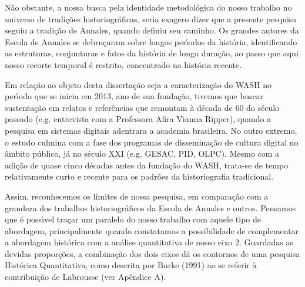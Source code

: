 \documentclass[
12pt,		%
openright,	%
twoside,  %
a4paper,			%
chapter=TITLE,		%
english,			%
french,				%
spanish,			%
brazil				%
]{USPSC-classe/USPSC}
\begin{document}
N\~ao obstante, a nossa busca pela identidade metodol\'ogica do nosso trabalho no universo de tradi\c{c}\~oes historiogr\'aficas, seria exagero dizer que a presente pesquisa seguiu a tradi\c{c}\~ao de Annales, quando definiu seu caminho. Os grandes autores da Escola de Annales se debru\c{c}aram sobre longos per\'{\i}odos da hist\'oria, identificando as estruturas, conjunturas e fatos da \textquotedbl hist\'oria de longa dura\c{c}\~ao\textquotedbl , ao passo que aqui nosso recorte temporal \'e restrito, concentrado na hist\'oria recente.

















Em rela\c{c}\~ao ao objeto desta disserta\c{c}\~ao seja a caracteriza\c{c}\~ao do WASH no per\'{\i}odo que se inicia em 2013, ano de sua funda\c{c}\~ao, tivemos que buscar sustenta\c{c}\~ao em relatos e refer\^encias que remontam \`a d\'ecada de 60 do s\'eculo passado (e.g. entrevista com a Professora Afira Vianna Ripper), quando a pesquisa em sistemas digitais adentrara a academia brasileira. No outro extremo, o estudo culmina com a fase dos programas de dissemina\c{c}\~ao de cultura digital no \^ambito p\'ublico, j\'a no s\'eculo XXI (e.g. GESAC, PID, OLPC).  Mesmo com a adi\c{c}\~ao de quase cinco d\'ecadas antes da funda\c{c}\~ao do WASH, trata-se de tempo relativamente curto e recente para os padr\~oes da historiografia tradicional.

















Assim, reconhecemos os limites de nossa pesquisa, em compara\c{c}\~ao com a grandeza dos trabalhos historiogr\'aficos da Escola de Annales e outros. Pensamos que \'e poss\'{\i}vel tra\c{c}ar um paralelo do nosso trabalho com aquele tipo de abordagem, principalmente quando constatamos a possibilidade de complementar a abordagem hist\'orica com a an\'alise quantitativa de nosso eixo 2. Guardadas as devidas propor\c{c}\~oes, a combina\c{c}\~ao dos dois eixos d\'a os contornos de uma pesquisa Hist\'orica Quantitativa, como descrita por  Burke (1991) ao se referir \`a contribui\c{c}\~ao de Labrousse (ver Ap\^endice A).
\end{document}
